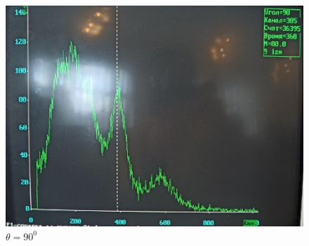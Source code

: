 \documentclass[a4paper, 12pt]{article}%
\begin{document}
\begin{figure}[h]
\begin{minipage}[h]{0.3\linewidth}
\includegraphics[width = 1\linewidth]{12.jpg}
\caption{$\theta = 90^0$}
\end{minipage}
\end{figure}
\end{document}
